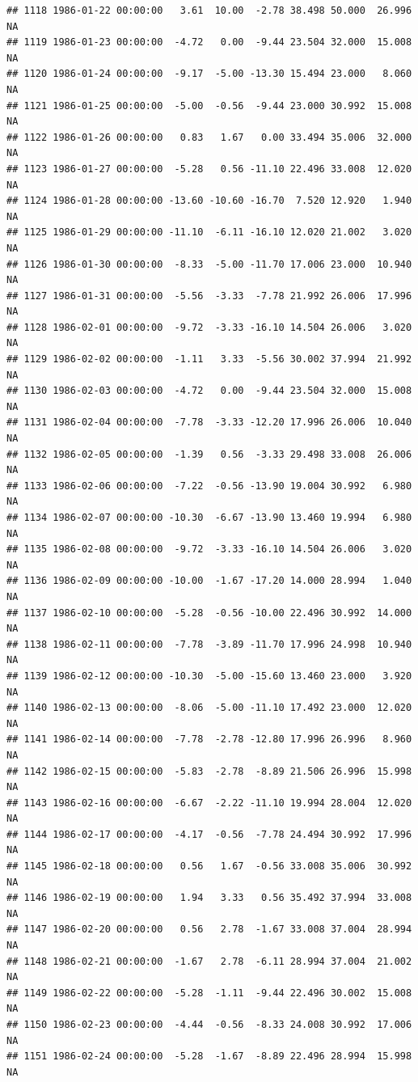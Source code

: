 \documentclass{article}\usepackage{graphicx, color}
\makeatletter
\newenvironment{kframe}{%
 \def\at@end@of@kframe{}%
 \ifinner\ifhmode%
  \def\at@end@of@kframe{\end{minipage}}%
  \begin{minipage}{\columnwidth}%
 \fi\fi%
 \def\FrameCommand##1{\hskip\@totalleftmargin \hskip-\fboxsep
 \colorbox{shadecolor}{##1}\hskip-\fboxsep
     \hskip-\linewidth \hskip-\@totalleftmargin \hskip\columnwidth}%
 \MakeFramed {\advance\hsize-\width
   \@totalleftmargin\z@ \linewidth\hsize
   \@setminipage}}%
 {\par\unskip\endMakeFramed%
 \at@end@of@kframe}
\newenvironment{knitrout}{}{} %
\makeatother
\begin{document}
\begin{knitrout}
\begin{kframe}
\begin{verbatim}
## 1118 1986-01-22 00:00:00   3.61  10.00  -2.78 38.498 50.000  26.996     NA
## 1119 1986-01-23 00:00:00  -4.72   0.00  -9.44 23.504 32.000  15.008     NA
## 1120 1986-01-24 00:00:00  -9.17  -5.00 -13.30 15.494 23.000   8.060     NA
## 1121 1986-01-25 00:00:00  -5.00  -0.56  -9.44 23.000 30.992  15.008     NA
## 1122 1986-01-26 00:00:00   0.83   1.67   0.00 33.494 35.006  32.000     NA
## 1123 1986-01-27 00:00:00  -5.28   0.56 -11.10 22.496 33.008  12.020     NA
## 1124 1986-01-28 00:00:00 -13.60 -10.60 -16.70  7.520 12.920   1.940     NA
## 1125 1986-01-29 00:00:00 -11.10  -6.11 -16.10 12.020 21.002   3.020     NA
## 1126 1986-01-30 00:00:00  -8.33  -5.00 -11.70 17.006 23.000  10.940     NA
## 1127 1986-01-31 00:00:00  -5.56  -3.33  -7.78 21.992 26.006  17.996     NA
## 1128 1986-02-01 00:00:00  -9.72  -3.33 -16.10 14.504 26.006   3.020     NA
## 1129 1986-02-02 00:00:00  -1.11   3.33  -5.56 30.002 37.994  21.992     NA
## 1130 1986-02-03 00:00:00  -4.72   0.00  -9.44 23.504 32.000  15.008     NA
## 1131 1986-02-04 00:00:00  -7.78  -3.33 -12.20 17.996 26.006  10.040     NA
## 1132 1986-02-05 00:00:00  -1.39   0.56  -3.33 29.498 33.008  26.006     NA
## 1133 1986-02-06 00:00:00  -7.22  -0.56 -13.90 19.004 30.992   6.980     NA
## 1134 1986-02-07 00:00:00 -10.30  -6.67 -13.90 13.460 19.994   6.980     NA
## 1135 1986-02-08 00:00:00  -9.72  -3.33 -16.10 14.504 26.006   3.020     NA
## 1136 1986-02-09 00:00:00 -10.00  -1.67 -17.20 14.000 28.994   1.040     NA
## 1137 1986-02-10 00:00:00  -5.28  -0.56 -10.00 22.496 30.992  14.000     NA
## 1138 1986-02-11 00:00:00  -7.78  -3.89 -11.70 17.996 24.998  10.940     NA
## 1139 1986-02-12 00:00:00 -10.30  -5.00 -15.60 13.460 23.000   3.920     NA
## 1140 1986-02-13 00:00:00  -8.06  -5.00 -11.10 17.492 23.000  12.020     NA
## 1141 1986-02-14 00:00:00  -7.78  -2.78 -12.80 17.996 26.996   8.960     NA
## 1142 1986-02-15 00:00:00  -5.83  -2.78  -8.89 21.506 26.996  15.998     NA
## 1143 1986-02-16 00:00:00  -6.67  -2.22 -11.10 19.994 28.004  12.020     NA
## 1144 1986-02-17 00:00:00  -4.17  -0.56  -7.78 24.494 30.992  17.996     NA
## 1145 1986-02-18 00:00:00   0.56   1.67  -0.56 33.008 35.006  30.992     NA
## 1146 1986-02-19 00:00:00   1.94   3.33   0.56 35.492 37.994  33.008     NA
## 1147 1986-02-20 00:00:00   0.56   2.78  -1.67 33.008 37.004  28.994     NA
## 1148 1986-02-21 00:00:00  -1.67   2.78  -6.11 28.994 37.004  21.002     NA
## 1149 1986-02-22 00:00:00  -5.28  -1.11  -9.44 22.496 30.002  15.008     NA
## 1150 1986-02-23 00:00:00  -4.44  -0.56  -8.33 24.008 30.992  17.006     NA
## 1151 1986-02-24 00:00:00  -5.28  -1.67  -8.89 22.496 28.994  15.998     NA

\end{verbatim}
\end{kframe}
\end{knitrout}
\end{document}
